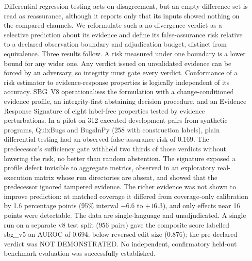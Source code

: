Differential regression testing acts on disagreement, but an empty difference set is read as reassurance, although it reports only that its inputs showed nothing on the compared channels. We reformulate such a no-divergence verdict as a selective prediction about its evidence and define its false-assurance risk relative to a declared observation boundary and adjudication budget, distinct from equivalence. Three results follow. A risk measured under one boundary is a lower bound for any wider one. Any verdict issued on unvalidated evidence can be forced by an adversary, so integrity must gate every verdict. Conformance of a risk estimator to evidence-response properties is logically independent of its accuracy. SBG~V8 operationalises the formulation with a change-conditioned evidence profile, an integrity-first abstaining decision procedure, and an Evidence Response Signature of eight label-free properties tested by evidence perturbations. In a pilot on 312 executed development pairs from synthetic programs, QuixBugs and BugsInPy (258 with construction labels), plain differential testing had an observed false-assurance risk of 0.169. The predecessor's sufficiency gate withheld two thirds of those verdicts without lowering the risk, no better than random abstention. The signature exposed a profile defect invisible to aggregate metrics, observed in an exploratory real-execution matrix whose run directories are absent, and showed that the predecessor ignored tampered evidence. The richer evidence was not shown to improve prediction: at matched coverage it differed from coverage-only calibration by 1.6 percentage points (95\% interval $-6.6$ to $+16.3$), and only effects near 16 points were detectable. The data are single-language and unadjudicated. A single run on a separate v8 test split (956 pairs) gave the composite score labelled sbg\_v5 an AUROC of 0.694, below reversed edit size (0.876); the pre-declared verdict was NOT DEMONSTRATED. No independent, confirmatory held-out benchmark evaluation was successfully established.
